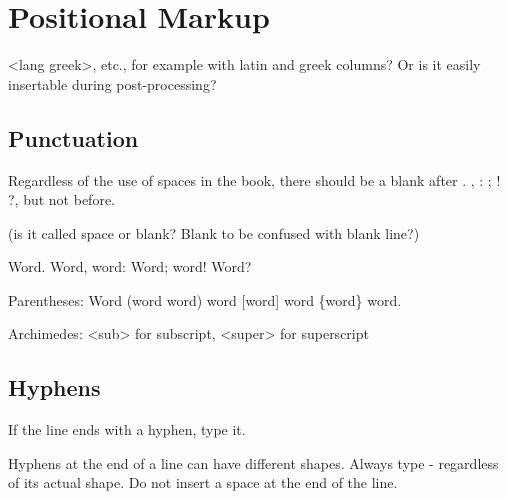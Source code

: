 \section{Positional Markup}


<lang greek>, etc., for example with latin and greek columns? Or is it easily insertable during post-processing?

\subsection{Punctuation}

Regardless of the use of spaces in the book, there should be a blank after . , : ; ! ?, but not before. 

(is it called space or blank? Blank to be confused with blank line?)

\qquad Word. Word, word: Word; word! Word?

Parentheses: Word (word word) word [word] word \{word\} word.

Archimedes: <sub> for subscript, <super> for superscript

\subsection{Hyphens}

\begin{mainrule}
If the line ends with a hyphen, type it.
\end{mainrule}

\begin{clarification}
Hyphens at the end of a line can have different shapes. Always type - regardless of its actual shape.
Do not insert a space at the end of the line. 
\end{clarification}


